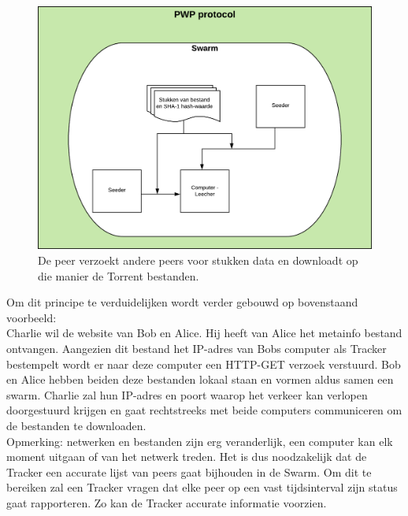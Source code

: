 \begin{figure}[h!]
	\centering
		\includegraphics[scale=0.6]{torrent-3.png}
	\caption[PWP stap - Torrenting 3]{De peer verzoekt andere peers voor stukken data en downloadt op die manier de Torrent bestanden.}
\end{figure}
\newpage
Om dit principe te verduidelijken wordt verder gebouwd op bovenstaand voorbeeld:\\

Charlie wil de website van Bob en Alice. Hij heeft van Alice het metainfo bestand ontvangen. Aangezien dit bestand het IP-adres van Bobs computer als Tracker bestempelt wordt er naar deze computer een HTTP-GET verzoek verstuurd. Bob en Alice hebben beiden deze bestanden lokaal staan en vormen aldus samen een swarm. Charlie zal hun IP-adres en poort waarop het verkeer kan verlopen doorgestuurd krijgen en gaat rechtstreeks met beide computers communiceren om de bestanden te downloaden.\\

Opmerking: netwerken en bestanden zijn erg veranderlijk, een computer kan elk moment uitgaan of van het netwerk treden. Het is dus noodzakelijk dat de Tracker een accurate lijst van peers gaat bijhouden in de Swarm. Om dit te bereiken zal een Tracker vragen dat elke peer op een vast tijdsinterval zijn status gaat rapporteren. Zo kan de Tracker accurate informatie voorzien.\\

